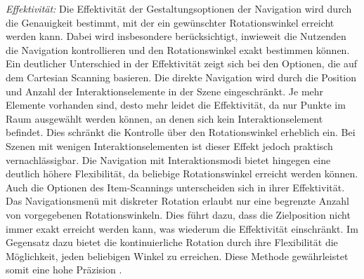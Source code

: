\textit{Effektivität:}
Die Effektivität der Gestaltungsoptionen der Navigation wird durch die Genauigkeit bestimmt, mit der ein gewünschter Rotationswinkel erreicht werden kann. Dabei wird insbesondere berücksichtigt, inwieweit die Nutzenden die Navigation kontrollieren und den Rotationswinkel exakt bestimmen können. \\
Ein deutlicher Unterschied in der Effektivität zeigt sich bei den Optionen, die auf dem Cartesian Scanning basieren. Die direkte Navigation wird durch die Position und Anzahl der Interaktionselemente in der Szene eingeschränkt. Je mehr Elemente vorhanden sind, desto mehr leidet die Effektivität, da nur Punkte im Raum ausgewählt werden können, an denen sich kein Interaktionselement befindet. Dies schränkt die Kontrolle über den Rotationswinkel erheblich ein. Bei Szenen mit wenigen Interaktionselementen ist dieser Effekt jedoch praktisch vernachlässigbar. Die Navigation mit Interaktionsmodi bietet hingegen eine deutlich höhere Flexibilität, da beliebige Rotationswinkel erreicht werden können.\\
Auch die Optionen des Item-Scannings unterscheiden sich in ihrer Effektivität. Das Navigationsmenü mit diskreter Rotation erlaubt nur eine begrenzte Anzahl von vorgegebenen Rotationswinkeln. Dies führt dazu, dass die Zielposition nicht immer exakt erreicht werden kann, was wiederum die Effektivität einschränkt. Im Gegensatz dazu bietet die kontinuierliche Rotation durch ihre Flexibilität die Möglichkeit, jeden beliebigen Winkel zu erreichen. Diese Methode gewährleistet somit eine hohe Präzision \citep{10.1145/2159365.2159386}. 

